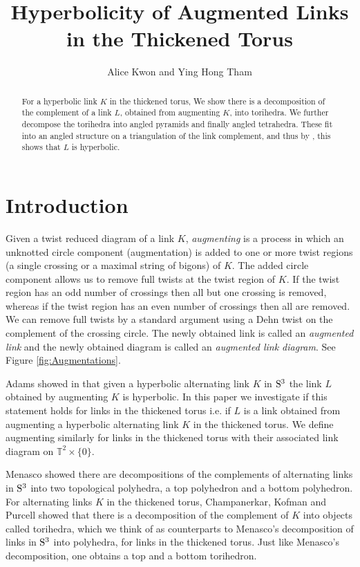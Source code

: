 \documentclass[11pt]{amsart}
\title{Hyperbolicity of Augmented Links in the Thickened Torus}
\author[Alice Kwon and Ying Hong Tham]{Alice Kwon and Ying Hong Tham}
\newcommand{\Sp}{{\rm{S}}}
\newcommand{\torus}{{\mathbb{T}^2}}
\theoremstyle{plain}
\theoremstyle{definition}
\begin{document}
\maketitle

\begin{abstract}
For a hyperbolic link $K$ in the thickened torus, We show there is a decomposition of the complement
of a link $L$, obtained from augmenting $K$, into torihedra. We further decompose 
the torihedra into angled pyramids and finally angled tetrahedra. These fit into an angled structure 
on a triangulation of the link complement, and thus by \cite{Casson-Rivin}, this shows
that $L$ is hyperbolic.  
\end{abstract}

\section{Introduction}
\label{s:intro}

Given a twist reduced diagram of a link $K$, \emph{augmenting} is a process in
which an unknotted circle component (augmentation) is added to one or more twist
regions (a single crossing or a maximal string of bigons) of $K$. The added circle
component allows us to remove full twists at the twist region of $K$. If the
twist region has an odd number of crossings then all but one crossing is
removed, whereas if the twist region has an even number of crossings then all
are removed. We can remove full twists by a standard argument using a Dehn twist 
on the complement of the crossing circle. The newly obtained link is called an 
\emph{augmented link} and the newly obtained diagram is called an 
\emph{augmented link diagram}. See Figure
\ref{fig:Augmentations}. 

Adams showed in \cite{CA} that given a hyperbolic alternating link $K$ in
$\Sp^3$ the link $L$ obtained by augmenting $K$ is hyperbolic. In this paper we
investigate if this statement holds for links in the thickened torus i.e. if $L$
is a link obtained from augmenting a hyperbolic alternating link $K$ in the
thickened torus. We define augmenting similarly for links in the thickened torus
with their associated link diagram on $\torus \times \{0\}.$ 

Menasco \cite{Menasco} showed there are decompositions of the complements of
alternating links in $\Sp^3$ into two topological polyhedra, a top polyhedron and a bottom
polyhedron.  For alternating links $K$ in the thickened torus, Champanerkar,
Kofman and Purcell \cite{CKP2} showed that there is a decomposition of the
complement of $K$ into objects called torihedra, which we think of as
counterparts to Menasco's decomposition of links in $\Sp^3$ into polyhedra, for
links in the thickened torus. Just like Menasco's decomposition, one obtains a
top and a bottom torihedron.
\end{document}
